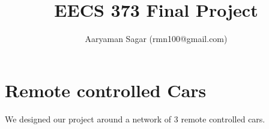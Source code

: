 \documentclass{article}
\begin{document}
\title{\textbf{EECS 373 Final Project}}
\author{Aaryaman Sagar (rmn100@gmail.com)}
\date{}
\maketitle

\section{Remote controlled Cars}
We designed our project around a network of 3 remote controlled cars.  
\end{document}
